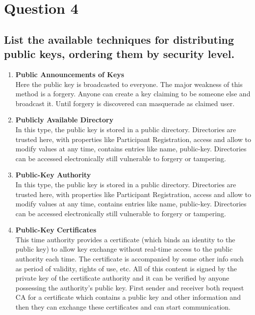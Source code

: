 \documentclass{report}
\begin{document}
	\section{Question 4}
	\startsection
		\renewcommand{\thesubsection}{\thesection.\Alph{subsection}}
		\subsection{List the available techniques for distributing public keys, ordering them by security level.}
		\begin{enumerate}[\textbullet]
			\item \textbf{Public Announcements of Keys} \\
			Here the public key is broadcasted to everyone. The major weakness of this method is a forgery. Anyone can create a key claiming to be someone else and broadcast it. Until forgery is discovered can masquerade as claimed user. 
			\item \textbf{Publicly Available Directory} \\
			In this type, the public key is stored in a public directory. Directories are trusted here, with properties like Participant Registration, access and allow to modify values at any time, contains entries like {name, public-key}. Directories can be accessed electronically still vulnerable to forgery or tampering. 
			\item \textbf{Public-Key Authority} \\
			In this type, the public key is stored in a public directory. Directories are trusted here, with properties like Participant Registration, access and allow to modify values at any time, contains entries like {name, public-key}. Directories can be accessed electronically still vulnerable to forgery or tampering. 
			\item \textbf{Public-Key Certificates} \\
			This time authority provides a certificate (which binds an identity to the public key) to allow key exchange without real-time access to the public authority each time. The certificate is accompanied by some other info such as period of validity, rights of use, etc. All of this content is signed by the private key of the certificate authority and it can be verified by anyone possessing the authority’s public key. First sender and receiver both request CA for a certificate which contains a public key and other information and then they can exchange these certificates and can start communication.
		\end{enumerate}
	\closesection
\end{document}
